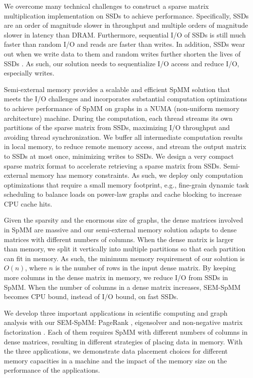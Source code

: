 We overcome many technical challenges to construct a sparse matrix
multiplication implementation on SSDs to achieve performance. Specifically,
SSDs are an order of magnitude slower in throughput and multiple orders of
magnitude slower in latency than DRAM. Furthermore, sequential I/O of SSDs
is still much faster
than random I/O \cite{safs} and reads are faster than writes. In addition,
SSDs wear out when we write data to them and random writes further shorten
the lives of SSDs \cite{sfs}. As such, our solution needs to sequentialize
I/O access and reduce I/O, especially writes.

Semi-external memory provides a scalable and efficient SpMM solution that
meets the I/O challenges and incorporates substantial computation optimizations
to achieve performance of SpMM on graphs in a NUMA (non-uniform memory
architecture) machine. During the computation, each
thread streams its own partitions of the sparse matrix from SSDs, maximizing
I/O throughput and avoiding thread synchronization. We buffer all
intermediate computation results in local memory, to reduce remote memory
access, and stream the output matrix to SSDs at most once, minimizing writes
to SSDs. We design a very compact sparse matrix format to accelerate retrieving
a sparse matrix from SSDs. Semi-external memory has memory constraints.
As such, we deploy only computation optimizations that require a small memory
footprint, e.g., fine-grain dynamic task scheduling to balance loads on
power-law graphs and cache blocking to increase CPU cache hits.

Given the sparsity and the enormous size of graphs, the dense matrices involved
in SpMM are massive and our semi-external memory solution adapts to
dense matrices with different numbers of columns. When the dense matrix is
larger than memory, we split it
vertically into multiple partitions so that each partition can fit in
memory. As such, the minimum memory requirement of our solution is $O(n)$,
where $n$ is the number of rows in the input dense matrix. By keeping more columns
in the dense matrix in memory, we reduce I/O from SSDs in SpMM. When the number
of columns in a dense matrix increases, SEM-SpMM becomes CPU bound, instead of
I/O bound, on fast SSDs.

We develop three important applications in scientific computing and graph
analysis
with our SEM-SpMM: PageRank \cite{pagerank}, eigensolver \cite{anasazi} and
non-negative matrix factorization \cite{nmf}. Each of them requires SpMM with
different numbers of columns in dense matrices, resulting in different
strategies of placing data in memory. With the three applications, we
demonstrate data placement choices for different memory capacities in a machine
and the impact of the memory size on the performance of the applications.

